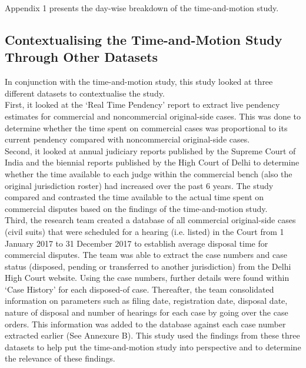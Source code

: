 \documentclass[a4paper, 12pt, twoside]{article}
\begin{document}
Appendix 1 presents the day-wise breakdown of the time-and-motion study. 

\subsection{Contextualising the Time-and-Motion Study Through Other Datasets}

In conjunction with the time-and-motion study, this study looked at three different datasets to contextualise the study. \\

First, it looked at the ‘Real Time Pendency’ report to extract live pendency estimates for commercial and noncommercial original-side cases. This was done to determine whether the time spent on commercial cases was proportional to its current pendency compared with noncommercial original-side cases. \\

Second, it looked at annual judiciary reports published by the Supreme Court of India and the biennial reports published by the High Court of Delhi to determine whether the time available to each judge within the commercial bench (also the original jurisdiction roster) had increased over the past 6 years. The study compared and contrasted the time available to the actual time spent on commercial disputes based on the findings of the time-and-motion study.\\

Third, the research team created a database of all commercial original-side cases (civil suits) that were scheduled for a hearing (i.e. listed) in the Court from 1 January 2017 to 31 December 2017 to establish average disposal time for commercial disputes. The team was able to extract the case numbers and case status (disposed, pending or transferred to another jurisdiction) from the Delhi High Court website. Using the case numbers, further details were found within ‘Case History’ for each disposed-of case. Thereafter, the team consolidated information on parameters such as filing date, registration date, disposal date, nature of disposal and number of hearings for each case by going over the case orders. This information was added to the database against each case number extracted earlier (See Annexure B). This study used the findings from these three datasets to help put the time-and-motion study into perspective and to determine the relevance of these findings.  
\end{document}
